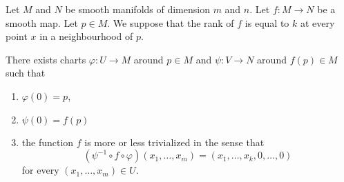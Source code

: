 \begin{theorem}       \label{THOooSWKVooTJQsXc}
    Let \( M\) and \( N\) be smooth manifolds of dimension \( m\) and \( n\). Let \( f\colon M\to N\) be a smooth map. Let \( p\in M\). We suppose that the rank of \( f\) is equal to \( k\) at every point \( x\) in a neighbourhood of \( p\). 

    There exists charts \( \varphi\colon U\to M\) around \( p\in M\) and \( \psi\colon V\to N\) around \( f(p)\in M\) such that 
    \begin{enumerate}
        \item
            \( \varphi(0)=p\),
        \item
            \( \psi(0)=f(p)\)
        \item
            the function \( f\) is more or less trivialized in the sense that
            \begin{equation}
                (\psi^{-1}\circ f\circ\varphi)(x_1,\ldots, x_m)=(x_1,\ldots, x_k,0,\ldots, 0)
            \end{equation}
            for every \( (x_1,\ldots, x_m)\in U\).
    \end{enumerate}
\end{theorem}


